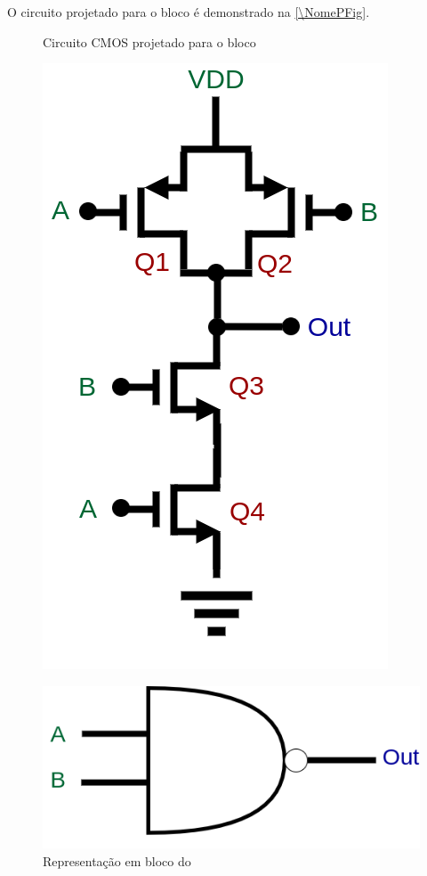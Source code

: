 O circuito projetado para o bloco \'e demonstrado na \autoref{\NomePFig}.

\begin{figure}[htbp]
 \label{NomePFig}
 \centering
  \begin{minipage}{0.4\textwidth}
    \centering
    \caption{Circuito CMOS projetado para o bloco \NomeBloco} \label{\NomePFig}
    \includegraphics[scale=0.3]{Circuitos/NAND.png}
  \end{minipage}
  \hfill
  \begin{minipage}{0.4\textwidth}
    \centering
    \caption{Representa{\c c}\~ao em bloco do \NomeBlocoNoIt} \label{NomeSFig}
    \includegraphics[scale=0.3]{Circuitos/NAND_block.png}
  \end{minipage}
\end{figure}